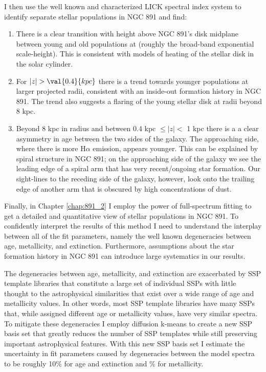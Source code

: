 I then use the well known and characterized LICK spectral index system
to identify separate stellar populations in NGC 891 and find:
\begin{enumerate}

\item There is a clear transition with height above NGC 891's disk
  midplane between young and old populations at 
  (roughly the broad-band exponential scale-height). This is
  consistent with models of heating of the stellar disk in the solar
  cylinder.

  \item For $|z| > \val{0.4}{kpc}$ there is a trend towards younger
    populations at larger projected radii, consistent with an
    inside-out formation history in NGC 891. The trend also suggests a
    flaring of the young stellar disk at radii beyond 8 kpc.

  \item Beyond 8 kpc in radius and between 0.4 kpc $\leq |z| <$ 1 kpc
    there is a a clear asymmetry in age between the two sides of the
    galaxy. The approaching side, where there is more H$\alpha$
    emission, appears younger. This can be explained by spiral
    structure in NGC 891; on the approaching side of the galaxy we see
    the leading edge of a spiral arm that has very recent/ongoing star
    formation. Our sight-lines to the receding side of the galaxy,
    however, look onto the trailing edge of another arm that is
    obscured by high concentrations of dust.

\end{enumerate}

Finally, in Chapter \ref{chap:891_2} I employ the power of
full-spectrum fitting to get a detailed and quantitative view of
stellar populations in NGC 891. To confidently interpret the results
of this method I need to understand the interplay between all of the
fit parameters, namely the well known degeneracies between age,
metallicity, and extinction. Furthermore, assumptions about the star
formation history in NGC 891 can introduce large systematics in our
results.

The degeneracies between age, metallicity, and extinction are
exacerbated by SSP template libraries that constitute a large set of
individual SSPs with little thought to the astrophysical similarities
that exist over a wide range of age and metallicity values. In other
words, most SSP template libraries have many SSPs that, while assigned
different age or metallicity values, have very similar spectra. To
mitigate these degeneracies I employ diffusion k-means to create a new
SSP basis set that greatly reduces the number of SSP templates while
still preserving important astrophysical features. With this new SSP
basis set I estimate the uncertainty in fit parameters caused by
degeneracies between the model spectra to be roughly 10\% for age and
extinction and \% for metallicity.

